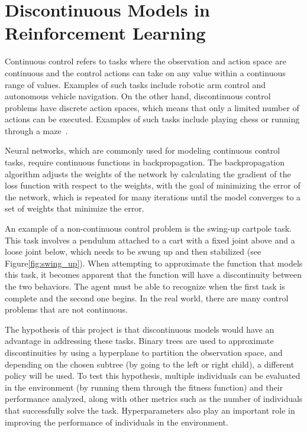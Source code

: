 \section{Discontinuous Models in Reinforcement Learning}

Continuous control refers to tasks where the observation and action space are continuous and the control actions can take on any value within a continuous range of values. Examples of such tasks include robotic arm control and autonomous vehicle navigation. On the other hand, discontinuous control problems have discrete action spaces, which means that only a limited number of actions can be executed. Examples of such tasks include playing chess or running through a maze~\cite{sutton_reinforcement_2018}.

Neural networks, which are commonly used for modeling continuous control tasks, require continuous functions in backpropagation. The backpropagation algorithm adjusts the weights of the network by calculating the gradient of the loss function with respect to the weights, with the goal of minimizing the error of the network, which is repeated for many iterations until the model converges to a set of weights that minimize the error.

An example of a non-continuous control problem is the swing-up cartpole task. This task involves a pendulum attached to a cart with a fixed joint above and a loose joint below, which needs to be swung up and then stabilized (see Figure\ref{fig:swing_up}). When attempting to approximate the function that models this task, it becomes apparent that the function will have a discontinuity between the two behaviors. The agent must be able to recognize when the first task is complete and the second one begins. In the real world, there are many control problems that are not continuous.

The hypothesis of this project is that discontinuous models would have an advantage in addressing these tasks. Binary trees are used to approximate discontinuities by using a hyperplane to partition the observation space, and depending on the chosen subtree (by going to the left or right child), a different policy will be used. To test this hypothesis, multiple individuals can be evaluated in the environment (by running them through the fitness function) and their performance analyzed, along with other metrics such as the number of individuals that successfully solve the task. Hyperparameters also play an important role in improving the performance of individuals in the environment.


